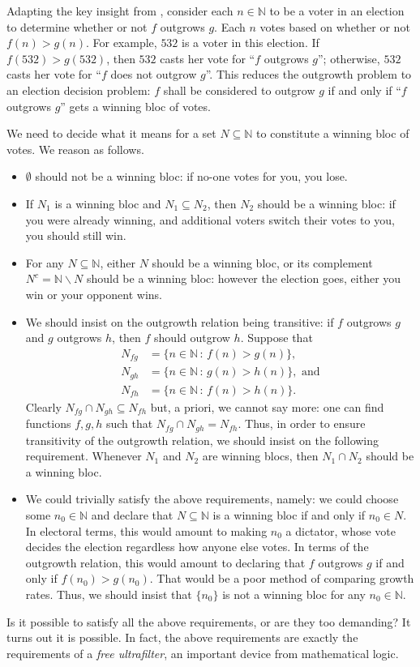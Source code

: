 \documentclass[twoside,11pt]{article}
\begin{document}
Adapting the key insight from \citet{alexander2019intelligence}, consider each $n\in\mathbb N$
to be a voter in an election to determine whether or not $f$ outgrows $g$.
Each $n$ votes based on whether or not $f(n)>g(n)$. For example, $532$ is a voter in this
election. If $f(532)>g(532)$, then $532$ casts her vote for ``$f$ outgrows $g$''; otherwise,
$532$ casts her vote for ``$f$ does not outgrow $g$''. This reduces the outgrowth problem
to an election decision problem: $f$ shall be considered to outgrow $g$ if and only if
``$f$ outgrows $g$'' gets a winning bloc of votes.

We need to decide what it means for a set $N\subseteq \mathbb N$ to constitute a winning
bloc of votes. We reason as follows.
\begin{itemize}
    \item $\emptyset$ should not be a winning bloc: if no-one votes for
    you, you lose.
    \item If $N_1$ is a winning bloc and $N_1\subseteq N_2$, then $N_2$ should
    be a winning bloc: if you were already winning, and additional voters switch
    their votes to you, you should still win.
    \item For any $N\subseteq \mathbb N$, either $N$ should be a winning bloc,
    or its complement $N^c=\mathbb N\backslash N$ should be a winning bloc:
    however the election goes, either you win or your opponent wins.
    \item We should insist on the outgrowth relation being transitive:
    if $f$ outgrows $g$ and $g$ outgrows $h$, then $f$ should outgrow $h$.
    Suppose that
    \begin{align*}
        N_{fg} &= \{ n\in\mathbb N \,:\, f(n)>g(n)\},\\
        N_{gh} &= \{ n\in\mathbb N \,:\, g(n)>h(n)\},\mbox{ and}\\
        N_{fh} &= \{ n\in\mathbb N \,:\, f(n)>h(n)\}.
    \end{align*}
    Clearly $N_{fg}\cap N_{gh}\subseteq N_{fh}$ but, a priori, we cannot say
    more: one can find functions $f,g,h$ such that
    $N_{fg}\cap N_{gh}=N_{fh}$. Thus, in order to ensure transitivity of the
    outgrowth relation, we should insist on the following requirement.
    Whenever $N_1$ and $N_2$ are winning blocs, then $N_1\cap N_2$ should be a winning bloc.
    \item We could trivially satisfy the
    above requirements, namely: we could choose some $n_0\in\mathbb N$ and
    declare that $N\subseteq \mathbb N$ is a winning bloc if and only if
    $n_0\in N$. In electoral terms, this would amount to making $n_0$ a dictator, whose
    vote decides the election regardless how anyone else votes. In terms of
    the outgrowth relation, this would amount to declaring that $f$ outgrows $g$
    if and only if $f(n_0)>g(n_0)$. That would be a poor method
    of comparing growth rates. Thus, we should insist that $\{n_0\}$ is not a winning
    bloc for any $n_0\in\mathbb N$.
\end{itemize}
Is it possible to satisfy all the above requirements, or are they too demanding?
It turns out it is possible. In fact, the above requirements are exactly the requirements
of a \emph{free ultrafilter}, an important device from mathematical logic.
\end{document}
